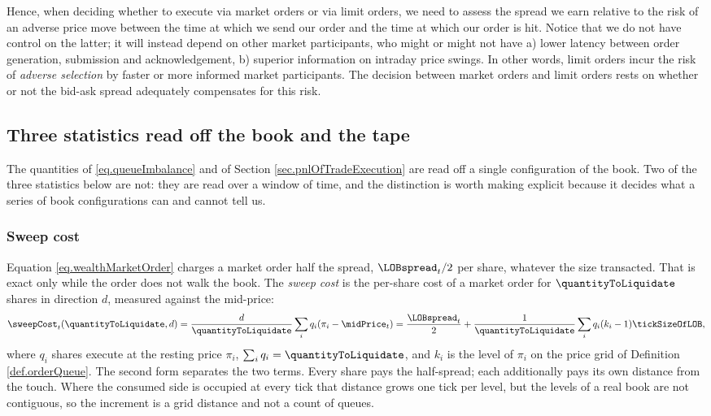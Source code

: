 Hence,
when deciding whether to execute via market orders or via limit orders,
we need to assess
the spread we earn relative to the risk
of an adverse price move
between the time at which we send our order
and
the time at which our order is hit.
Notice that
we do not have control on the latter;
it will instead depend on other market participants,
who might or might not have
a) lower latency between order generation, submission and acknowledgement,
b) superior information on intraday price swings.
In other words,
limit orders incur the risk of
\emph{adverse selection}
by faster or more informed market participants.
The decision between market orders and limit orders
rests
on whether
or not
the bid-ask spread adequately compensates for this risk.

\subsection{Three statistics read off the book and the tape}
\label{sec.bookStatistics}

The quantities of \eqref{eq.queueImbalance} and of Section \ref{sec.pnlOfTradeExecution}
are read off a single configuration of the book.
Two of the three statistics below are not:
they are read over a window of time,
and the distinction is worth making explicit
because it decides what a series of book configurations can and cannot tell us.

\subsubsection{Sweep cost}

Equation \eqref{eq.wealthMarketOrder} charges a market order half the spread,
$\LOBspread_t/2$ per share,
whatever the size transacted.
That is exact only while the order does not walk the book.
The \emph{sweep cost} is the per-share cost of a market order for
$\quantityToLiquidate$ shares in direction $d$,
measured against the mid-price:
\begin{equation}
\label{eq.sweepCost}
\sweepCost_t(\quantityToLiquidate, d)
=
\frac{d}{\quantityToLiquidate}\sum_{i} q_i (\pi_i - \midPrice_t)
=
\frac{\LOBspread_t}{2}
+
\frac{1}{\quantityToLiquidate}\sum_{i} q_i (k_i - 1)\tickSizeOfLOB,
\end{equation}
where $q_i$ shares execute at the resting price $\pi_i$,
$\sum_i q_i = \quantityToLiquidate$,
and $k_i$ is the level of $\pi_i$ on the price grid of Definition \ref{def.orderQueue}.
The second form separates the two terms.
Every share pays the half-spread;
each additionally pays its own distance from the touch.
Where the consumed side is occupied at every tick that distance grows one tick per level,
but the levels of a real book are not contiguous,
so the increment is a grid distance and not a count of queues.

